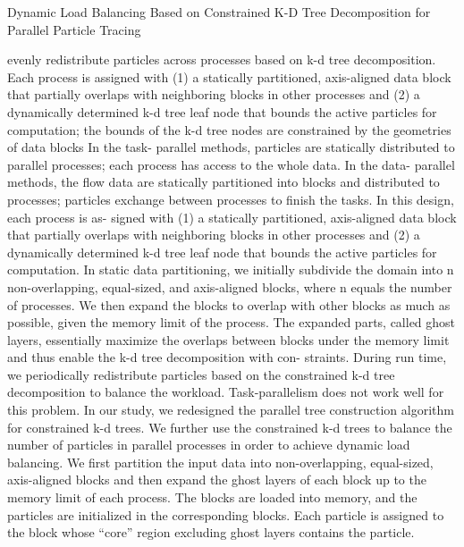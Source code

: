 \documentclass{article}
\begin{document}
\cite{8017633}

Dynamic Load Balancing Based on Constrained K-D Tree Decomposition for Parallel Particle Tracing 

evenly redistribute particles across processes based on k-d tree decomposition. Each process is assigned with (1) a statically partitioned, axis-aligned data block that partially overlaps with neighboring blocks in other processes and (2) a dynamically determined k-d tree leaf node that bounds the active particles for computation; the bounds of the k-d tree nodes are constrained by the geometries of data blocks 
In the task- parallel methods, particles are statically distributed to parallel processes; each process has access to the whole data.  In the data- parallel methods, the flow data are statically partitioned into blocks and distributed to processes; particles exchange between processes to finish the tasks. 
In this design, each process is as- signed with (1) a statically partitioned, axis-aligned data block that partially overlaps with neighboring blocks in other processes and (2) a dynamically determined k-d tree leaf node that bounds the active particles for computation. 
In static data partitioning, we initially subdivide the domain into n non-overlapping, equal-sized, and axis-aligned blocks, where n equals the number of processes. We then expand the blocks to overlap with other blocks as much as possible, given the memory limit of the process. The expanded parts, called ghost layers, essentially maximize the overlaps between blocks under the memory limit and thus enable the k-d tree decomposition with con- straints. During run time, we periodically redistribute particles based on the constrained k-d tree decomposition to balance the workload. 
Task-parallelism does not work well for this problem.
In our study, we redesigned the parallel tree construction algorithm for constrained k-d trees. We further use the constrained k-d trees to balance the number of particles in parallel processes in order to achieve dynamic load balancing. 
We first partition the input data into non-overlapping, equal-sized, axis-aligned blocks and then expand the ghost layers of each block up to the memory limit of each process. The blocks are loaded into memory, and the particles are initialized in the corresponding blocks.  Each particle is assigned to the block whose  “core” region excluding ghost layers contains the particle. 
\end{document}
